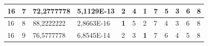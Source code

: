 \documentclass[conference]{IEEEtran}
\begin{document}
\begin{table}[]
\begin{tabular}{|llll|llllllll|}
\multicolumn{1}{|l|}{16}                                                    & \multicolumn{1}{l|}{7}                                                        & \multicolumn{1}{l|}{72,2777778}                                                   & 5,1129E-13                     & \multicolumn{1}{l|}{2}                                                  & \multicolumn{1}{l|}{4}                                                  & \multicolumn{1}{l|}{\textbf{1}}                                         & \multicolumn{1}{l|}{7}                                                  & \multicolumn{1}{l|}{5}                                                  & \multicolumn{1}{l|}{3}                                                  & \multicolumn{1}{l|}{6}                                                  & 8                          \\ \hline
\multicolumn{1}{|l|}{16}                                                    & \multicolumn{1}{l|}{8}                                                        & \multicolumn{1}{l|}{88,2222222}                                                   & 2,8663E-16                     & \multicolumn{1}{l|}{\textbf{1}}                                         & \multicolumn{1}{l|}{5}                                                  & \multicolumn{1}{l|}{2}                                                  & \multicolumn{1}{l|}{7}                                                  & \multicolumn{1}{l|}{4}                                                  & \multicolumn{1}{l|}{3}                                                  & \multicolumn{1}{l|}{6}                                                  & 8                          \\ \hline
\multicolumn{1}{|l|}{16}                                                    & \multicolumn{1}{l|}{9}                                                        & \multicolumn{1}{l|}{76,5777778}                                                   & 6,8545E-14                     & \multicolumn{1}{l|}{2}                                                  & \multicolumn{1}{l|}{3}                                                  & \multicolumn{1}{l|}{\textbf{1}}                                         & \multicolumn{1}{l|}{7}                                                  & \multicolumn{1}{l|}{6}                                                  & \multicolumn{1}{l|}{4}                                                  & \multicolumn{1}{l|}{5}                                                  & 8                          \\ \hline

\end{tabular}
\end{table}
\end{document}
